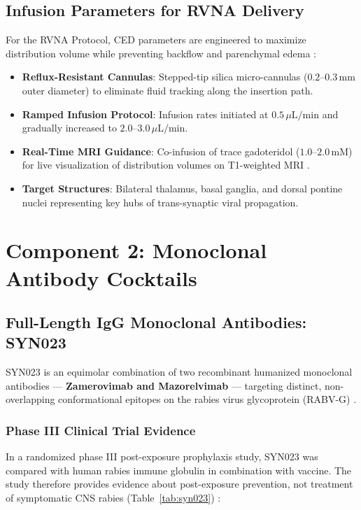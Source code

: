 \documentclass[12pt,a4paper]{article}
\begin{document}
\subsection{Infusion Parameters for RVNA Delivery}

For the RVNA Protocol, CED parameters are engineered to maximize distribution volume while preventing backflow and parenchymal edema \citep{parvar2025ced}:
\begin{itemize}
    \item \textbf{Reflux-Resistant Cannulas}: Stepped-tip silica micro-cannulas ($0.2\text{--}0.3\,\mathrm{mm}$ outer diameter) to eliminate fluid tracking along the insertion path.
    \item \textbf{Ramped Infusion Protocol}: Infusion rates initiated at $0.5\,\mu\mathrm{L/min}$ and gradually increased to $2.0\text{--}3.0\,\mu\mathrm{L/min}$.
    \item \textbf{Real-Time MRI Guidance}: Co-infusion of trace gadoteridol ($1.0\text{--}2.0\,\mathrm{mM}$) for live visualization of distribution volumes on T1-weighted MRI \citep{narsinh2025ced, munjal2026ced}.
    \item \textbf{Target Structures}: Bilateral thalamus, basal ganglia, and dorsal pontine nuclei representing key hubs of trans-synaptic viral propagation.
\end{itemize}

\section{Component 2: Monoclonal Antibody Cocktails}

\subsection{Full-Length IgG Monoclonal Antibodies: SYN023}

SYN023 is an equimolar combination of two recombinant humanized monoclonal antibodies --- \textbf{Zamerovimab and Mazorelvimab} --- targeting distinct, non-overlapping conformational epitopes on the rabies virus glycoprotein (RABV-G) \citep{liu2025syn023}.

\subsubsection{Phase III Clinical Trial Evidence}

In a randomized phase III post-exposure prophylaxis study, SYN023 was compared with human rabies immune globulin in combination with vaccine. The study therefore provides evidence about post-exposure prevention, not treatment of symptomatic CNS rabies (Table~\ref{tab:syn023}) \citep{liu2025syn023}:
\end{document}
